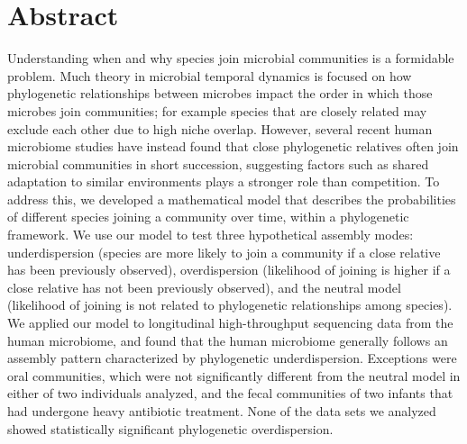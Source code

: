 \documentclass{article}
\begin{document}
\newpage


{\parindent0pt \section{Abstract}}
Understanding when and why species join microbial communities is a formidable problem. Much theory in microbial temporal dynamics is focused on how phylogenetic relationships between microbes impact the order in which those microbes join communities; for example species that are closely related may exclude each other due to high niche overlap. However, several recent human microbiome studies have instead found that close phylogenetic relatives often join microbial communities in short succession, suggesting factors such as shared adaptation to similar environments plays a stronger role than competition. To address this, we developed a mathematical model that describes the probabilities of different species joining a community over time, within a phylogenetic framework. We use our model to test three hypothetical assembly modes: underdispersion (species are more likely to join a community if a close relative has been previously observed), overdispersion (likelihood of joining is higher if a close relative has not been previously observed), and the neutral model (likelihood of joining is not related to phylogenetic relationships among species). We applied our model to longitudinal high-throughput sequencing data from the human microbiome, and found that the human microbiome generally follows an assembly pattern characterized by phylogenetic underdispersion. Exceptions were oral communities, which were not significantly different from the neutral model in either of two individuals analyzed, and the fecal communities of two infants that had undergone heavy antibiotic treatment. None of the data sets we analyzed showed statistically significant phylogenetic overdispersion.
\\\par
\end{document}
